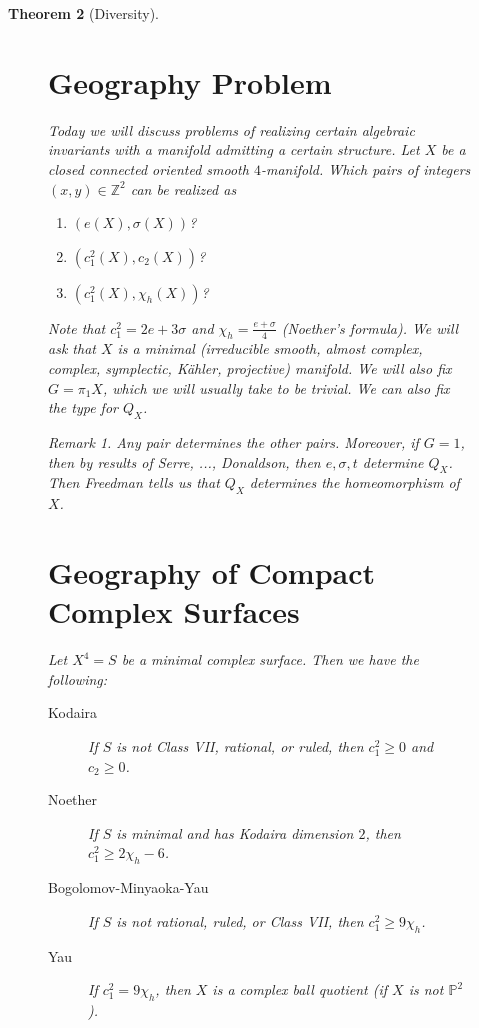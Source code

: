 \documentclass[leqno, openany]{memoir}
\newtheorem{thm}{Theorem}[chapter]
\theoremstyle{definition}
\theoremstyle{remark}
\newtheorem{rmk}[thm]{Remark}
\theoremstyle{plain}
\theoremstyle{definition}
\theoremstyle{remark}
\newcommand{\Z}{\mathbb{Z}}
\renewcommand{\P}{\mathbb{P}}
\begin{document}
\begin{thm}[Diversity]
\begin{figure}[H]
\section{Geography Problem}%

Today we will discuss problems of realizing certain algebraic invariants with a
manifold admitting a certain structure. Let $X$ be a closed connected oriented
smooth $4$-manifold. Which pairs of integers $(x,y) \in \Z^2$ can be realized
as \begin{enumerate} \item $(e(X), \sigma(X))$?  \item $(c_1^2(X), c_2(X))$?
\item $(c_1^2(X), \chi_h(X))$?  \end{enumerate} Note that $c_1^2 = 2e + 3
    \sigma$ and $\chi_h = \frac{e+\sigma}{4}$ (Noether's formula).  We will ask
    that $X$ is a minimal (irreducible smooth, almost complex, complex,
    symplectic, K\"ahler, projective) manifold. We will also fix $G = \pi_1 X$,
    which we will usually take to be trivial. We can also fix the type for
    $Q_X$.

\begin{rmk} Any pair determines the other pairs. Moreover, if $G = 1$, then by
results of Serre, ..., Donaldson, then $e, \sigma, t$ determine $Q_X$. Then
Freedman tells us that $Q_X$ determines the homeomorphism of $X$.  \end{rmk}

\section{Geography of Compact Complex Surfaces}%
\label{sec:geography_of_compact_complex_surfaces}

Let $X^4 = S$ be a minimal complex surface. Then we have the following:
\begin{description} \item[Kodaira] If $S$ is not Class VII,  rational, or
    ruled, then $c_1^2 \geq 0$ and $c_2 \geq 0$.  \item[Noether] If $S$ is
    minimal and has Kodaira dimension $2$, then $c_1^2 \geq 2\chi_h - 6$.
\item[Bogolomov-Minyaoka-Yau] If $S$ is not rational, ruled, or Class VII, then
    $c_1^2 \geq 9 \chi_h$.  \item[Yau] If $c_1^2 = 9 \chi_h$, then $X$ is a
    complex ball quotient (if $X$ is not $\P^2$).  \end{description}


\end{figure}
\end{thm}
\end{document}

